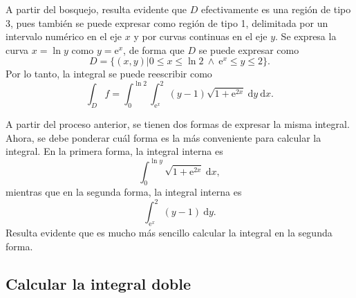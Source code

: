 \documentclass{fmbvecto}
\begin{document}
\begin{problema}
    \vspace{1em}
    A partir del bosquejo, resulta evidente que \(D\) efectivamente es una región de tipo 3, pues también se puede expresar como región de tipo 1, delimitada por un intervalo numérico en el eje \(x\) y por curvas continuas en el eje \(y\). Se expresa la curva \(x = \ln y\) como \(y = \mathrm{e}^x\), de forma que \(D\) se puede expresar como
    \[D = \{(x, y) | 0 \leq x \leq \ln 2 \ \land \ \mathrm{e}^x \leq y \leq 2\}.\]
    Por lo tanto, la integral se puede reescribir como
    \[ \int_D f = \int_{0}^{\ln 2} \int_{\mathrm{e}^x}^{2} (y-1) \sqrt{1 + \mathrm{e}^{2x}} \: \mathrm{d}y \: \mathrm{d}x. \]

    A partir del proceso anterior, se tienen dos formas de expresar la misma integral. Ahora, se debe ponderar cuál forma es la más conveniente para calcular la integral. En la primera forma, la integral interna es
    \[ \int_{0}^{\ln y} \sqrt{1 + \mathrm{e}^{2x}} \: \mathrm{d}x, \]
    mientras que en la segunda forma, la integral interna es
    \[ \int_{\mathrm{e}^x}^{2} (y-1) \: \mathrm{d}y. \]
    Resulta evidente que es mucho más sencillo calcular la integral en la segunda forma.

    \subsection{Calcular la integral doble}


\end{problema}
\end{document}
